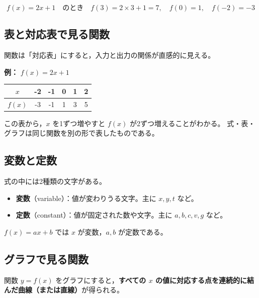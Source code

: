 \documentclass[paper=a4,fleqn]{jlreq}
\begin{document}
\[
  f(x) = 2x + 1 \quad\text{のとき} \quad
  f(3) = 2 \times 3 + 1 = 7,\quad
  f(0) = 1,\quad
  f(-2) = -3
\]

\subsection{表と対応表で見る関数}

関数は「対応表」にすると，入力と出力の関係が直感的に見える。

\textbf{例：} \(f(x)=2x+1\)

\begin{center}
\renewcommand{\arraystretch}{1.5}
\begin{tabular}{c|ccccc}
\hline
\(x\) & -2 & -1 & 0 & 1 & 2 \\
\hline
\(f(x)\) & -3 & -1 & 1 & 3 & 5 \\
\hline
\end{tabular}
\end{center}

この表から，\(x\) を1ずつ増やすと \(f(x)\) が2ずつ増えることがわかる。
式・表・グラフは同じ関数を別の形で表したものである。

\needspace{0.42\textheight}
\subsection{変数と定数}

式の中には2種類の文字がある。

\begin{itemize}
  \item \textbf{変数}（variable）：値が変わりうる文字。主に \(x, y, t\) など。
  \item \textbf{定数}（constant）：値が固定された数や文字。主に \(a, b, c, v, g\) など。
\end{itemize}

\(f(x)=ax+b\) では \(x\) が変数，\(a,b\) が定数である。

\subsection{グラフで見る関数}

関数 \(y = f(x)\) をグラフにすると，\textbf{すべての \(x\) の値に対応する点を連続的に結んだ曲線（または直線）}が得られる。

\begin{center}
\end{center}
\end{document}
